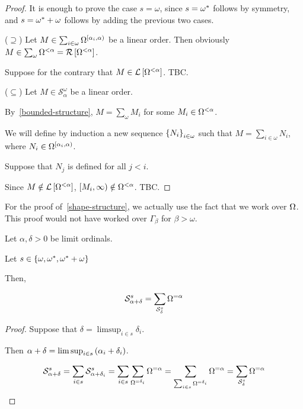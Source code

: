 \begin{proof}
  It is enough to prove the case $s = \omega$,
  since $s = \omega^\ast$ follows by symmetry,
  and $s = \omega^\ast + \omega$ follows by adding the previous two cases.

  ($\supseteq$) Let $M \in \sum_{i \in \omega}{\Omega^{[\alpha_i, \alpha)}}$ be a linear order.
  Then obviously $M \in \sum_{\omega}{\Omega^{< \alpha}} = \mathcal{R} \left[ {{\Omega^{< \alpha}}} \right]$.

  Suppose for the contrary that $M \in \mathcal{L} \left[ {{\Omega^{< \alpha}}} \right]$.
  TBC.

  ($\subseteq$) Let $M \in \mathcal{S}^{\omega}_{\alpha}$ be a linear order.

  By~\cref{bounded-structure}, $M = \sum_{\omega}{M_i}$ for some $M_i \in \Omega^{< \alpha}$.

  We will define by induction a new sequence $\left\{ {N_i} \right\}_{i \in \omega}$ such that $M = \sum_{i \in \omega} N_i$,
  where $N_i \in \Omega^{[\alpha_i, \alpha)}$.

  Suppose that $N_j$ is defined for all $j < i$.

  Since $M \notin \mathcal{L} \left[ {{\Omega^{< \alpha}}} \right]$, $[M_i, \infty) \notin \Omega^{< \alpha}$.
  TBC.
\end{proof}

\begin{note}
  For the proof of~\cref{shape-structure}, we actually use the fact that
  we work over $\Omega$. This proof would not have worked over $\Gamma_{\beta}$
  for $\beta > \omega$.
\end{note}

\begin{corollary}
  Let $\alpha, \delta > 0$ be limit ordinals.

  Let $s \in \left\{ {\omega, \omega^\ast, \omega^\ast + \omega} \right\}$

  Then,

  \[
    \mathcal{S}^{s}_{\alpha + \delta}
    = \sum_{\mathcal{S}^{s}_{\delta}}{\Omega^{= \alpha}}
  \]
\end{corollary}

\begin{proof}
  Suppose that $\delta = \limsup_{i \in s} \delta_i$.

  Then $\alpha + \delta = \limsup_{i \in s} \left( {\alpha_i + \delta_i} \right)$.

  \[
    \mathcal{S}^{s}_{\alpha + \delta}
    = \sum_{i \in s}{\mathcal{S}^{s}_{\alpha + \delta_i}}
    = \sum_{i \in s}\sum_{\Omega^{= \delta_i}}{\Omega^{= \alpha}}
    = \sum_{\sum_{i \in s}{\Omega^{= \delta_i}}}{\Omega^{= \alpha}}
    = \sum_{\mathcal{S}^{s}_{\delta}}{\Omega^{= \alpha}}
  \]
\end{proof}
